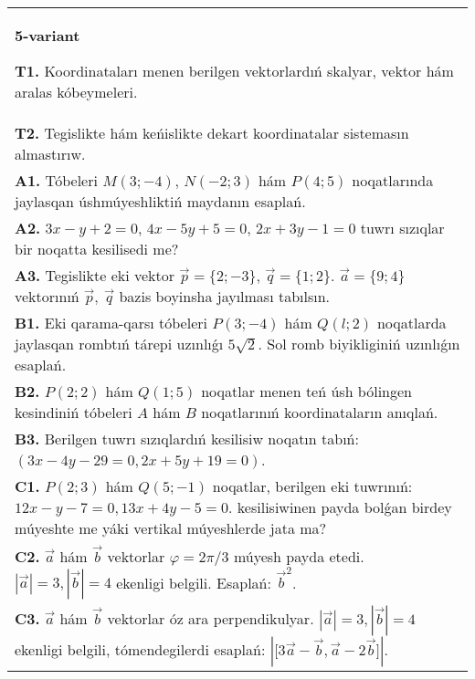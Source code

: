 \documentclass{article}
\begin{document}
\begin{tabular}{m{17cm}}
\textbf{5-variant}

\textbf{T1.} 
Koordinataları menen berilgen vektorlardıń skalyar, vektor hám aralas kóbeymeleri.
 \\
\textbf{T2.} 
Tegislikte hám keńislikte dekart koordinatalar sistemasın almastırıw.
 \\
\textbf{A1.} 
Tóbeleri $M (3;-4) $, $N (-2;3) $ hám $P (4;5) $
noqatlarında jaylasqan úshmúyeshliktiń maydanın esaplań.
 \\
\textbf{A2.} 
$3x-y+2=0$, $4x-5y+5=0$, $2x+3y-1=0$
tuwrı sızıqlar bir noqatta kesilisedi me?
 \\
\textbf{A3.} 
Tegislikte eki vektor
$\overrightarrow{p} = \{ 2; - 3\}$, $\overrightarrow{q} = \{ 1;2\}$.
$\overrightarrow{a} = \{9;4\}$ vektorınıń
$\overrightarrow{p},\ \overrightarrow{q}$ bazis boyinsha jayılması tabılsın.
 \\
\textbf{B1.} 
Eki qarama-qarsı tóbeleri $P (3; -4) $ hám $Q (l;2) $ noqatlarda jaylasqan rombtıń tárepi uzınlıǵı \(5\sqrt{2}\). Sol romb biyikliginiń uzınlıǵın esaplań.
 \\
\textbf{B2.} 
\(P (2;2) \) hám \(Q (1;5) \) noqatlar menen teń úsh
bólingen kesindiniń tóbeleri $A$ hám $B$ noqatlarınıń
koordinataların anıqlań.
 \\
\textbf{B3.} 
Berilgen tuwrı sızıqlardıń kesilisiw noqatın tabıń:
$(3x-4y-29=0, 2x+5y+19=0) $.
 \\
\textbf{C1.} 
\(P (2;3) \) hám \(Q (5;-1) \) noqatlar, berilgen eki
tuwrınıń: $12x-y-7=0, 13x+4y-5=0$.
kesilisiwinen payda bolǵan birdey múyeshte me yáki vertikal 
múyeshlerde jata ma?
 \\
\textbf{C2.} 
$\vec{a}$ hám $\vec{b}$ vektorlar $\varphi = 2\pi/3$ múyesh payda etedi. $|\vec{a}| = 3,|\vec{b}| = 4$ ekenligi belgili. Esaplań:
${\vec{b}}^{2}$.
 \\
\textbf{C3.} 
$\vec{a}$ hám $\vec{b}$ vektorlar óz ara perpendikulyar. $|\vec{a}| = 3,|\vec{b}| = 4$ ekenligi belgili, tómendegilerdi esaplań:
$|\lbrack 3\vec{a} - \vec{b},\vec{a}-2\vec{b}\rbrack|$.
 \\

\end{tabular}
\vspace{1cm}
\end{document}
